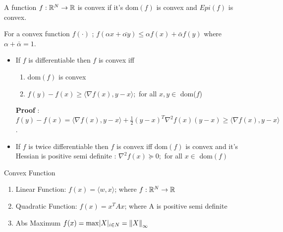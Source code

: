 \documentclass[a4paper,english,12pt]{article}
\begin{document}
{\begin{defn}
A function $f:\mathbb{R}^N\to\mathbb{R}$ is convex if it's dom$(f)$ is convex and $Epi(f)$ is convex. 
\end{defn}
\begin{note}
For a convex function $f(\cdot)$ ; $f(\alpha x + \bar{\alpha y} ) \leq \alpha f(x) + \bar{\alpha} f(y)$ where $\alpha + \bar{\alpha} =1$.\\	
	\begin{itemize}
		\item If $f$ is differentiable then $f$ is convex iff 
		\begin{enumerate}
			\item dom$(f)$ is convex
			\item $f(y) -f(x) \geq \langle\nabla f(x), y-x\rangle; $ for all $ x,y \in$ dom($f$)
		\end{enumerate}	 
		\textbf{Proof} : $ f(y) - f(x) = \langle\nabla f(x) , y-x\rangle + \frac{1}{2}(y-x)^T \nabla^2 f(x) (y-x) \geq \langle\nabla f(x) , y-x\rangle$.
		\item If $f$ is twice differentiable then $f$ is convex iff dom$(f)$ is convex and it's Hessian is positive semi definite : $\nabla^2 f(x)\succeq 0; $ for all $ x \in$ dom$(f)$
	\end{itemize}
	
\end{note}

\begin{exmp}{Convex Function}
	\begin{enumerate}
		\item Linear Function:  $f(x) = \langle w,x\rangle$; where $f:\mathbb{R}^N\to\mathbb{R}$
		\item Quadratic Function: $f(x) = x^TAx$; where A is positive semi definite 
		\item Abs Maximum $f(x) = \max \lvert X\rvert_{i \in N} = \left\lVert X\right\rVert_\infty$		
	\end{enumerate}

\end{exmp}

}
\end{document}
